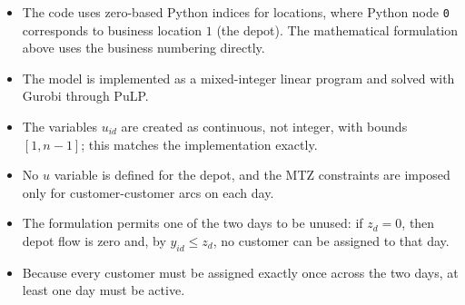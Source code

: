 \begin{itemize}
    \item The code uses zero-based Python indices for locations, where Python node \texttt{0} corresponds to business location $1$ (the depot). The mathematical formulation above uses the business numbering directly.
    \item The model is implemented as a mixed-integer linear program and solved with Gurobi through PuLP.
    \item The variables $u_{id}$ are created as continuous, not integer, with bounds $[1,n-1]$; this matches the implementation exactly.
    \item No $u$ variable is defined for the depot, and the MTZ constraints are imposed only for customer-customer arcs on each day.
    \item The formulation permits one of the two days to be unused: if $z_d=0$, then depot flow is zero and, by $y_{id}\le z_d$, no customer can be assigned to that day.
    \item Because every customer must be assigned exactly once across the two days, at least one day must be active.
\end{itemize}
